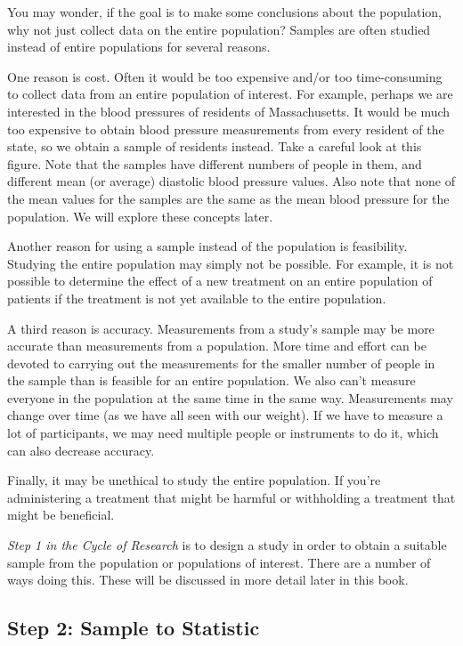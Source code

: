 \documentclass[
]{book}
\begin{document}
You may wonder, if the goal is to make some conclusions about the population, why not just collect data on the entire population? Samples are often studied instead of entire populations for several reasons.

One reason is cost. Often it would be too expensive and/or too time-consuming to collect data from an entire population of interest. For example, perhaps we are interested in the blood pressures of residents of Massachusetts. It would be much too expensive to obtain blood pressure measurements from every resident of the state, so we obtain a sample of residents instead. Take a careful look at this figure. Note that the samples have different numbers of people in them, and different mean (or average) diastolic blood pressure values. Also note that none of the mean values for the samples are the same as the mean blood pressure for the population. We will explore these concepts later.

Another reason for using a sample instead of the population is feasibility. Studying the entire population may simply not be possible. For example, it is not possible to determine the effect of a new treatment on an entire population of patients if the treatment is not yet available to the entire population.

A third reason is accuracy. Measurements from a study's sample may be more accurate than measurements from a population. More time and effort can be devoted to carrying out the measurements for the smaller number of people in the sample than is feasible for an entire population. We also can't measure everyone in the population at the same time in the same way. Measurements may change over time (as we have all seen with our weight). If we have to measure a lot of participants, we may need multiple people or instruments to do it, which can also decrease accuracy.

Finally, it may be unethical to study the entire population. If you're administering a treatment that might be harmful or withholding a treatment that might be beneficial.

\emph{Step 1 in the Cycle of Research} is to design a study in order to obtain a suitable sample from the population or populations of interest. There are a number of ways doing this. These will be discussed in more detail later in this book.

\hypertarget{step-2-sample-to-statistic}{%
\subsection{Step 2: Sample to Statistic}\label{step-2-sample-to-statistic}}
\end{document}
